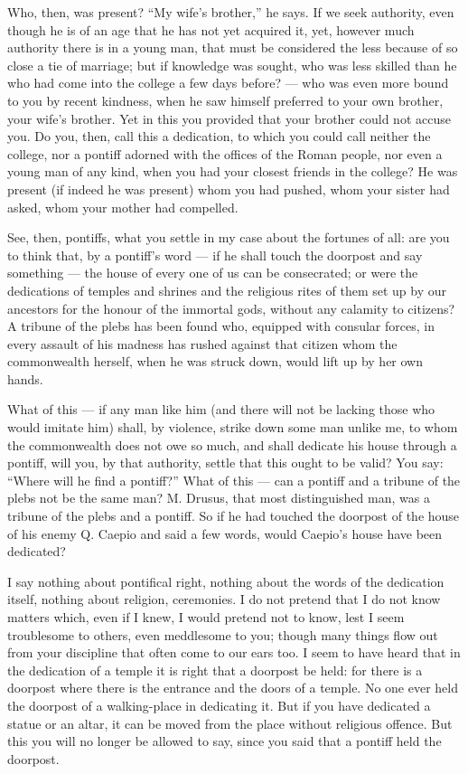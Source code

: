  Who, then, was present? ``My wife's brother,'' he says. If we seek authority, even though he is of an age that he has not yet acquired it, yet, however much authority there is in a young man, that must be considered the less because of so close a tie of marriage; but if knowledge was sought, who was less skilled than he who had come into the college a few days before? --- who was even more bound to you by recent kindness, when he saw himself preferred to your own brother, your wife's brother. Yet in this you provided that your brother could not accuse you. Do you, then, call this a dedication, to which you could call neither the college, nor a pontiff adorned with the offices of the Roman people, nor even a young man of any kind, when you had your closest friends in the college? He was present (if indeed he was present) whom you had pushed, whom your sister had asked, whom your mother had compelled.

 See, then, pontiffs, what you settle in my case about the fortunes of all: are you to think that, by a pontiff's word --- if he shall touch the doorpost and say something --- the house of every one of us can be consecrated; or were the dedications of temples and shrines and the religious rites of them set up by our ancestors for the honour of the immortal gods, without any calamity to citizens? A tribune of the plebs has been found who, equipped with consular forces, in every assault of his madness has rushed against that citizen whom the commonwealth herself, when he was struck down, would lift up by her own hands.

 What of this --- if any man like him (and there will not be lacking those who would imitate him) shall, by violence, strike down some man unlike me, to whom the commonwealth does not owe so much, and shall dedicate his house through a pontiff, will you, by that authority, settle that this ought to be valid? You say: ``Where will he find a pontiff?'' What of this --- can a pontiff and a tribune of the plebs not be the same man? M. Drusus, that most distinguished man, was a tribune of the plebs and a pontiff. So if he had touched the doorpost of the house of his enemy Q. Caepio and said a few words, would Caepio's house have been dedicated?

 I say nothing about pontifical right, nothing about the words of the dedication itself, nothing about religion, ceremonies. I do not pretend that I do not know matters which, even if I knew, I would pretend not to know, lest I seem troublesome to others, even meddlesome to you; though many things flow out from your discipline that often come to our ears too. I seem to have heard that in the dedication of a temple it is right that a doorpost be held: for there is a doorpost where there is the entrance and the doors of a temple. No one ever held the doorpost of a walking-place in dedicating it. But if you have dedicated a statue or an altar, it can be moved from the place without religious offence. But this you will no longer be allowed to say, since you said that a pontiff held the doorpost.

